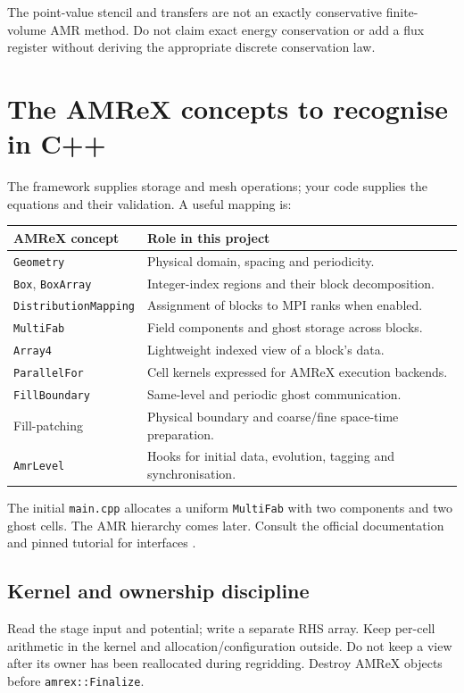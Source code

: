 \documentclass[11pt,a4paper]{article}
\numberwithin{equation}{section}
\newcommand{\code}[1]{\texttt{#1}}
\begin{document}
The point-value stencil and transfers are not an exactly conservative
finite-volume AMR method. Do not claim exact energy conservation or add
a flux register without deriving the appropriate discrete conservation law.

\section{The AMReX concepts to recognise in C++}\label{sec:amrex}

The framework supplies storage and mesh operations; your code supplies
the equations and their validation. A useful mapping is:
\begin{center}
\begin{tabularx}{\textwidth}{@{}lX@{}}
\toprule
AMReX concept & Role in this project\\
\midrule
\code{Geometry} & Physical domain, spacing and periodicity.\\
\code{Box}, \code{BoxArray} & Integer-index regions and their block decomposition.\\
\code{DistributionMapping} & Assignment of blocks to MPI ranks when enabled.\\
\code{MultiFab} & Field components and ghost storage across blocks.\\
\code{Array4} & Lightweight indexed view of a block's data.\\
\code{ParallelFor} & Cell kernels expressed for AMReX execution backends.\\
\code{FillBoundary} & Same-level and periodic ghost communication.\\
Fill-patching & Physical boundary and coarse/fine space-time preparation.\\
\code{AmrLevel} & Hooks for initial data, evolution, tagging and synchronisation.\\
\bottomrule
\end{tabularx}
\end{center}

The initial \code{main.cpp} allocates a uniform \code{MultiFab} with
two components and two ghost cells. The AMR hierarchy comes later.
Consult the official documentation and pinned tutorial for interfaces
\cite{amrex,wave,gpu}.

\subsection{Kernel and ownership discipline}
Read the stage input and potential; write a separate RHS array. Keep
per-cell arithmetic in the kernel and allocation/configuration outside.
Do not keep a view after its owner has been reallocated during regridding.
Destroy AMReX objects before \code{amrex::Finalize}.
\end{document}
